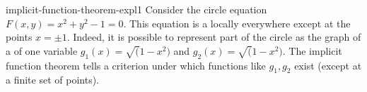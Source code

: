 \documentclass[preview]{standalone}
\begin{document}
\genpage

\begin{snippet}{implicit-function-theorem-expl1}
    Consider the circle equation \(F(x,y)=x^2+y^2-1=0\).
    This equation is a \function locally everywhere except at the points \(x=\pm 1\).
    Indeed, it is possible to represent part of the circle as the graph
    of a \function of one variable \(g_1(x) = \sqrt(1-x^2)\) and
    \(g_2(x) = \sqrt(1-x^2)\).
    The implicit function theorem tells a criterion under which
    functions like \(g_1, g_2\) exist (except at a finite set of points). 
\end{snippet}
\end{document}
